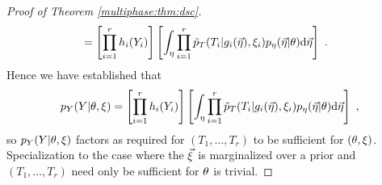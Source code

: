 \begin{proof}[Proof of Theorem \ref{multiphase:thm:dsc}]
\begin{align}
 \nonumber
 &= \left[ \prod_{i=1}^{r} h_i(Y_i) \right] \left[ \int_{\eta} \prod_{i=1}^{r} \tilde{p}_T(T_i | g_i(\vec {\eta}), \xi_i) p_\eta(\vec {\eta} | \theta) \mathrm{d} \vec {\eta} \right] \ .
\end{align}
Hence we have established that
\begin{equation}
p_Y(Y | \theta, \xi) = \left[ \prod_{i=1}^{r} h_i(Y_i) \right] \left[ \int_{\eta} \prod_{i=1}^{r} \tilde{p}_T(T_i | g_i(\vec {\eta}), \xi_i) p_\eta(\vec {\eta} | \theta) \mathrm{d} \vec {\eta} \right] \ ,
\end{equation}
so $p_Y(Y | \theta, \xi)$ factors as required for $(T_1, \ldots, T_r)$ to be sufficient for $(\theta, \xi)$.
Specialization to the case where the $\vec {\xi}$ is marginalized over a prior and $(T_1, \ldots, T_r)$ need only be sufficient for $\theta$ is trivial.
\end{proof}

